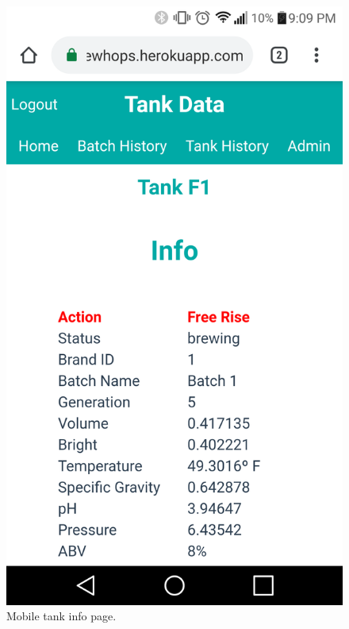 \documentclass[draftclsnofoot,onecolumn,journal,letterpaper,compsoc,10pt]{IEEEtran}
\begin{document}
\begin{figure}[H]
    \centering
    \includegraphics[height=0.4\textheight]{screenshots/progress_report_screencap-mobile_tank_info.png}
    \caption{Mobile tank info page.}
\end{figure}
\end{document}
